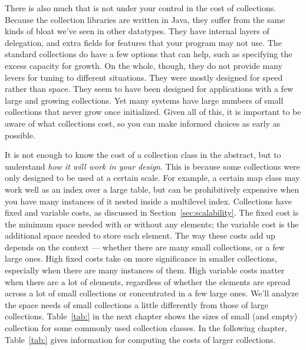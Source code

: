 There is also much that is not under your control in the cost
of collections.
Because the collection libraries are written in Java, they suffer
from the same kinds of bloat we've seen in other datatypes. They have
internal layers of delegation, and extra fields for features that your program may not use. The standard
collections do have a few options that can help, such as
specifying the excess capacity for growth. On the whole, though, they do not
provide many levers for tuning to different situations. They were mostly
designed for speed rather than space.  They seem to have been designed for
applications with a few large and growing collections. Yet many systems have large numbers
of small collections that never grow once initialized. Given all of this, it is important
to be aware of what collections cost, so you can make informed choices as early as possible. 

It is not enough to know the cost of a collection class in the abstract, but to
understand \emph{how it will work in your design}. This is because some
collections were only designed to be used at a certain scale. 
For example, a certain map class may work
well as an index over a large table, but can be prohibitively expensive when you
have many instances of it nested inside a multilevel index. Collections have fixed and
variable costs, as discussed in Section~\ref{sec:scalability}. 
The fixed cost is the minimum space needed with or
without any elements; the variable cost is the additional space needed to
store each element. The way these costs add up
depends on the context ---
whether there are many small collections, or a few large ones. 
High fixed costs take on more significance in smaller collections,
especially when there are many instances of them. High variable costs matter
when there are a lot of elements, regardless of whether the elements are spread across
a lot of small collections or concentrated in a few large ones.
We'll analyze the space needs of small collections a little differently
from those of large collections. Table~\ref{tab:} in the next chapter shows the
sizes of small (and empty) collection for some commonly used collection classes. 
In the following chapter, Table~\ref{tab:} gives
information for computing the costs of larger collections.






